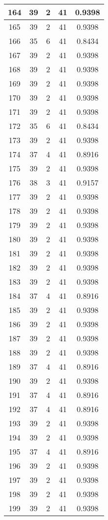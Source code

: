 \documentclass[letterpaper, 12pt]{article}
\begin{document}
\begin{longtable}{|c|c|c|c|c|}
\hline
164 & 39 & 2 & 41 & 0.9398 \\
\hline
165 & 39 & 2 & 41 & 0.9398 \\
\hline
166 & 35 & 6 & 41 & 0.8434 \\
\hline
167 & 39 & 2 & 41 & 0.9398 \\
\hline
168 & 39 & 2 & 41 & 0.9398 \\
\hline
169 & 39 & 2 & 41 & 0.9398 \\
\hline
170 & 39 & 2 & 41 & 0.9398 \\
\hline
171 & 39 & 2 & 41 & 0.9398 \\
\hline
172 & 35 & 6 & 41 & 0.8434 \\
\hline
173 & 39 & 2 & 41 & 0.9398 \\
\hline
174 & 37 & 4 & 41 & 0.8916 \\
\hline
175 & 39 & 2 & 41 & 0.9398 \\
\hline
176 & 38 & 3 & 41 & 0.9157 \\
\hline
177 & 39 & 2 & 41 & 0.9398 \\
\hline
178 & 39 & 2 & 41 & 0.9398 \\
\hline
179 & 39 & 2 & 41 & 0.9398 \\
\hline
180 & 39 & 2 & 41 & 0.9398 \\
\hline
181 & 39 & 2 & 41 & 0.9398 \\
\hline
182 & 39 & 2 & 41 & 0.9398 \\
\hline
183 & 39 & 2 & 41 & 0.9398 \\
\hline
184 & 37 & 4 & 41 & 0.8916 \\
\hline
185 & 39 & 2 & 41 & 0.9398 \\
\hline
186 & 39 & 2 & 41 & 0.9398 \\
\hline
187 & 39 & 2 & 41 & 0.9398 \\
\hline
188 & 39 & 2 & 41 & 0.9398 \\
\hline
189 & 37 & 4 & 41 & 0.8916 \\
\hline
190 & 39 & 2 & 41 & 0.9398 \\
\hline
191 & 37 & 4 & 41 & 0.8916 \\
\hline
192 & 37 & 4 & 41 & 0.8916 \\
\hline
193 & 39 & 2 & 41 & 0.9398 \\
\hline
194 & 39 & 2 & 41 & 0.9398 \\
\hline
195 & 37 & 4 & 41 & 0.8916 \\
\hline
196 & 39 & 2 & 41 & 0.9398 \\
\hline
197 & 39 & 2 & 41 & 0.9398 \\
\hline
198 & 39 & 2 & 41 & 0.9398 \\
\hline
199 & 39 & 2 & 41 & 0.9398 \\
\hline
\end{longtable}
\end{document}
